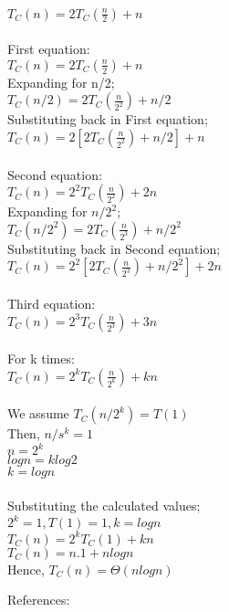 \documentclass[a4paper]{exam}
\begin{document}
\begin{questions}
\begin{solution}
\\$T_C(n)= 2T_C(\frac{n}{2}) + n$
\\
\\First equation:
\\$T_C(n)= 2T_C(\frac{n}{2}) + n$
\\Expanding for n/2;
\\$T_C(n/2)= 2T_C(\frac{n}{2^2}) + n/2$
\\Substituting back in First equation;
\\$T_C(n)= 2[2T_C(\frac{n}{2^2}) + n/2] + n$
\\
\\Second equation:
\\$T_C(n)= 2^2T_C(\frac{n}{2^2}) + 2n$
\\Expanding for $n/2^2$;
\\$T_C(n/2^2)= 2T_C(\frac{n}{2^3}) + n/2^2$
\\Substituting back in Second equation;
\\$T_C(n)= 2^2[2T_C(\frac{n}{2^3}) + n/2^2] + 2n$
\\
\\Third equation:
\\$T_C(n)= 2^3T_C(\frac{n}{2^3}) + 3n$
\\
\\For k times:
\\$T_C(n)= 2^kT_C(\frac{n}{2^k}) + kn$
\\
\\We assume $T_C(n/2^k) = T(1)$ 
\\Then, $n/s^k = 1$
\\$n = 2^k$
\\$logn = klog2$
\\$k=logn$
\\
\\Substituting the calculated values;
\\$2^k=1, T(1)=1, k=logn$
\\$T_C(n)= 2^kT_C(1) + kn$
\\$T_C(n)= n.1 + nlogn$
\\Hence, $T_C(n)=\Theta(nlogn)$
  \end{solution}
References:

  
\end{questions}
\end{document}
